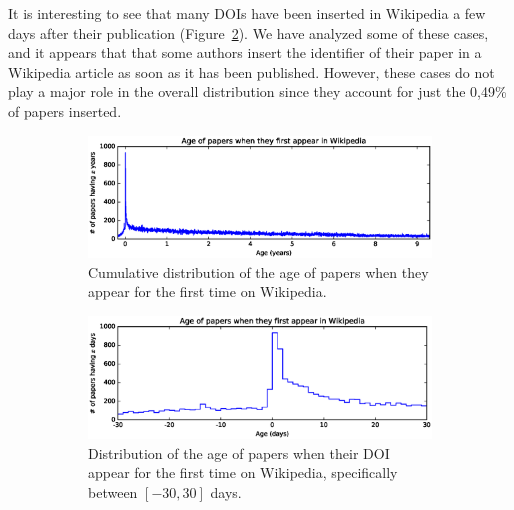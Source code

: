 It is interesting to see that many \acp{DOI} have been inserted in Wikipedia a few days after their publication (Figure~\ref{fig:age_of_papers_at_first_appearance_pdf_near0}).
We have analyzed some of these cases, and it appears that that some authors insert the identifier of their paper in a Wikipedia article as soon as it has been published.
However, these cases do not play a major role in the overall distribution since they account for just the 0,49\% of papers inserted.



\begin{figure}[h]
    \centering
    \begin{subfigure}{1\textwidth}
        \centering
        \includegraphics[keepaspectratio=true, width=\linewidth]{assets/age_of_papers_at_first_appearance_pdf}
        \caption{Cumulative distribution of the age of papers when they appear for the first time on Wikipedia.}
\label{fig:age_of_papers_at_first_appearance_pdf}
    \end{subfigure}
    \begin{subfigure}{1\textwidth}
        \centering
        \includegraphics[keepaspectratio=true, width=\linewidth]{assets/age_of_papers_at_first_appearance_pdf_near0}
        \caption{Distribution of the age of papers when their DOI appear for the first time on Wikipedia, specifically between $[-30, 30]$ days.}
\label{fig:age_of_papers_at_first_appearance_pdf_near0}
    \end{subfigure}
    \begin{subfigure}{1\textwidth}
        \centering

\end{subfigure}
\end{figure}
